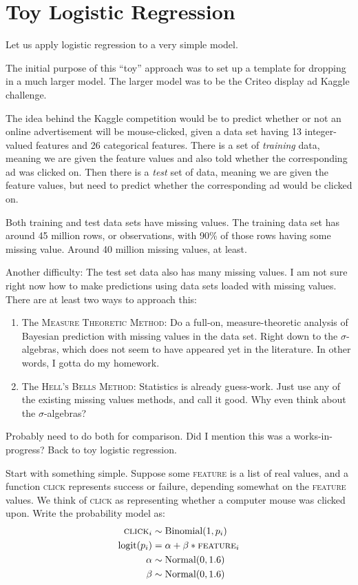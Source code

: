 \documentclass[
twoside=true,
paper=letter,
fontsize=9pt,
pagesize=auto,
leqno,
openany,
headsepline,
overfullrule,
]{scrbook}
\theoremstyle{plain}
\theoremstyle{plain}
\theoremstyle{definition}
\theoremstyle{bfnoteitalic}
\theoremstyle{bfnoteroman}
\newcommand{\textsigma}{\hbox{\large{$\sigma$}}\kern-1pt}
\begin{document}
\section{Toy Logistic Regression}
Let us apply logistic regression to a very simple model.
\begin{quoting}\small{
The initial purpose of this ``toy'' approach was  to set up a template for dropping in a much larger model.
The larger model was to be the Criteo display ad Kaggle challenge.

The idea behind the Kaggle competition would be to predict whether or not an online advertisement will be mouse-clicked, given a data set having 13 integer\hyp{}valued features and 26 categorical features.
There is a set of \emph{training} data, meaning we are given the feature values and also told whether the corresponding ad was clicked on. Then there is a \emph{test} set of data, meaning we are given the feature values, but need to predict whether the corresponding ad would be clicked on.

Both training and test data sets have missing values.  The training data set has around 45 million rows, or observations, with 90\% of those rows having some missing value. Around 40 million missing values, at least.

Another difficulty: The test set data also has many missing values.  I am not sure right now how to make predictions using data sets loaded with missing values.  There are at least two ways to approach this:
\begin{enumerate}
\item
The \textsc{Measure Theoretic Method:}
Do a full-on, measure\hyp{}theoretic analysis  of Bayesian prediction with missing values in the data set.
Right down to the \textsigma\hyp{}algebras, which does not seem to have appeared yet in the literature. In other words, I gotta do my homework.
\item
The \textsc{Hell's Bells Method:}
Statistics is already guess-work. Just use any of the existing missing values methods, and call it good.
Why even think about the \textsigma\hyp{}algebras?
\end{enumerate}
Probably need to do both for comparison.
Did I mention this was a works\hyp{}in\hyp{}progress? Back to toy logistic regression.}
\end{quoting}
Start with something simple.  Suppose some \textsc{feature} is a list of real values, and a function \textsc{click} represents success or failure, depending somewhat on the \textsc{feature} values. We think of \textsc{click} as representing whether a computer mouse was clicked upon.
Write the probability model as:
\begin{align*}
\textsc{click}_i & \sim \text{Binomial}(1,p_i) \\
\text{logit}(p_i) & = \alpha + \beta * \textsc{feature}_i \\
\alpha & \sim \text{Normal}(0, 1.6) \\
\beta & \sim \text{Normal}(0, 1.6) \\
\end{align*}
\end{document}
